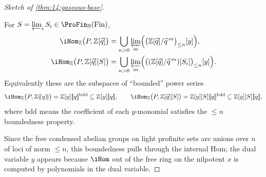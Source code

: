 \begin{proof}[Sketch of \cref{thm:14:gaseous-base}]
\begin{lemma}
\label{lem:14:hom-P}
For $S=\varprojlim_i S_i\in\ProFin_{\mathbb{N}}(\mathrm{Fin})$,
\begin{equation*}
\begin{aligned}
\iHom_{\mathbb{Z}}\bigl(P,\mathbb{Z}[\widehat{q}]\bigr)
&=\bigcup_{n>0}\varprojlim_m
\Bigl(\bigl(\mathbb{Z}[\widehat q]/\widehat q^{\,m}\bigr)_{\le n}[y]\Bigr),\\
\iHom_{\mathbb{Z}}\bigl(P,\mathbb{Z}[\widehat q][S]\bigr)
&=\bigcup_{n>0}\varprojlim_m
\Bigl(\bigl((\mathbb{Z}[\widehat q]/\widehat q^{\,m})[S_i]\bigr)_{\le n}[y]\Bigr).
\end{aligned}
\end{equation*}
Equivalently these are the subspaces of ``bounded'' power series
\begin{equation}
\label{eq:14:hom-P-bdd}
\iHom_{\mathbb{Z}}\bigl(P,\mathbb{Z}(\!(q)\!)\bigr)=\mathbb{Z}[y][\![q]\!]^{\mathrm{bdd}}\subseteq\mathbb{Z}[y][\![q]\!],\qquad
\iHom_{\mathbb{Z}}\bigl(P,\mathbb{Z}[\widehat q][S]\bigr)=\mathbb{Z}[y][S][\![q]\!]^{\mathrm{bdd}}\subseteq\mathbb{Z}[y][S][\![q]\!],
\end{equation}
where $\mathrm{bdd}$ means the coefficient of each $y$-monomial satisfies the
$\le n$ boundedness property.
\end{lemma}

Since the free condensed abelian groups on light profinite sets are unions over $n$
of loci of norm $\le n$, this boundedness pulls through the internal Hom; the dual
variable $y$ appears because $\iHom$ out of the free ring on the nilpotent $x$ is
computed by polynomials in the dual variable.


\end{proof}
